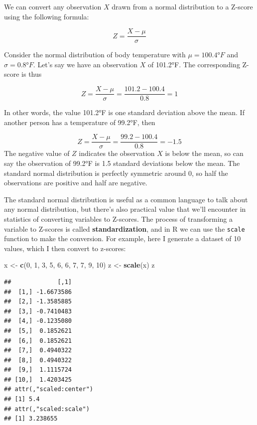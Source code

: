 \documentclass[
]{book}
\newenvironment{Shaded}{\begin{snugshade}}{\end{snugshade}}
\newcommand{\DecValTok}[1]{\textcolor[rgb]{0.00,0.00,0.81}{#1}}
\newcommand{\FunctionTok}[1]{\textcolor[rgb]{0.13,0.29,0.53}{\textbf{#1}}}
\newcommand{\NormalTok}[1]{#1}
\newcommand{\OtherTok}[1]{\textcolor[rgb]{0.56,0.35,0.01}{#1}}
\begin{document}
We can convert any observation \(X\) drawn from a normal distribution to a Z-score using the following formula:

\[
Z = \frac{X-\mu}{\sigma}
\]

Consider the normal distribution of body temperature with \(\mu = 100.4°F\) and \(\sigma=0.8°F\). Let's say we have an observation \(X\) of 101.2°F. The corresponding Z-score is thus

\[
Z = \frac{X-\mu}{\sigma} =\frac{101.2-100.4}{0.8}=1 
\]

In other words, the value 101.2°F is one standard deviation above the mean. If another person has a temperature of 99.2°F, then

\[
Z = \frac{X-\mu}{\sigma} =\frac{99.2-100.4}{0.8}=-1.5
\]
The negative value of \(Z\) indicates the observation \(X\) is below the mean, so can say the observation of 99.2°F is 1.5 standard deviations below the mean. The standard normal distribution is perfectly symmetric around 0, so half the observations are positive and half are negative.

The standard normal distribution is useful as a common language to talk about any normal distribution, but there's also practical value that we'll encounter in statistics of converting variables to Z-scores. The process of transforming a variable to Z-scores is called \textbf{standardization}, and in R we can use the \texttt{scale} function to make the conversion. For example, here I generate a dataset of 10 values, which I then convert to z-scores:

\begin{Shaded}
\begin{Highlighting}[]
\NormalTok{x }\OtherTok{\textless{}{-}} \FunctionTok{c}\NormalTok{(}\DecValTok{0}\NormalTok{, }\DecValTok{1}\NormalTok{, }\DecValTok{3}\NormalTok{, }\DecValTok{5}\NormalTok{, }\DecValTok{6}\NormalTok{, }\DecValTok{6}\NormalTok{, }\DecValTok{7}\NormalTok{, }\DecValTok{7}\NormalTok{, }\DecValTok{9}\NormalTok{, }\DecValTok{10}\NormalTok{)}
\NormalTok{z }\OtherTok{\textless{}{-}} \FunctionTok{scale}\NormalTok{(x)}
\NormalTok{z}
\end{Highlighting}
\end{Shaded}

\begin{verbatim}
##             [,1]
##  [1,] -1.6673586
##  [2,] -1.3585885
##  [3,] -0.7410483
##  [4,] -0.1235080
##  [5,]  0.1852621
##  [6,]  0.1852621
##  [7,]  0.4940322
##  [8,]  0.4940322
##  [9,]  1.1115724
## [10,]  1.4203425
## attr(,"scaled:center")
## [1] 5.4
## attr(,"scaled:scale")
## [1] 3.238655
\end{verbatim}
\end{document}
